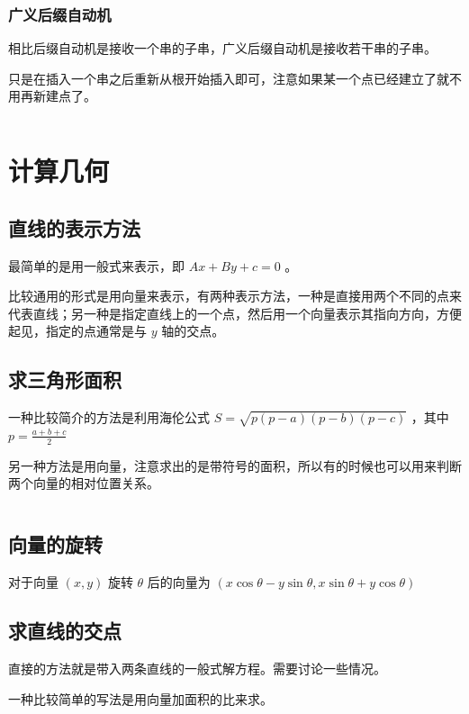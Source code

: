 \documentclass[UTF-8]{ctexart}
\newcommand{\cpp}[1]{\inputminted[bgcolor=bg,breaklines,breakanywhere=true]{c++}{#1}}
\begin{document}
			\subsubsection{广义后缀自动机}
			相比后缀自动机是接收一个串的子串，广义后缀自动机是接收若干串的子串。
	
			只是在插入一个串之后重新从根开始插入即可，注意如果某一个点已经建立了就不用再新建点了。
			\cpp{code//String//lsam.cpp}
	\newpage
	\section{计算几何}
		\subsection{直线的表示方法}
		最简单的是用一般式来表示，即 $Ax+By+c=0$ 。  
	
		比较通用的形式是用向量来表示，有两种表示方法，一种是直接用两个不同的点来代表直线；另一种是指定直线上的一个点，然后用一个向量表示其指向方向，方便起见，指定的点通常是与 $y$ 轴的交点。
		\subsection{求三角形面积}
		一种比较简介的方法是利用海伦公式 $S=\sqrt{p(p-a)(p-b)(p-c)}$ ，其中 $p=\frac{a+b+c}{2}$
	
		另一种方法是用向量，注意求出的是带符号的面积，所以有的时候也可以用来判断两个向量的相对位置关系。
		\cpp{code//Geometry//cross.cpp}
		\subsection{向量的旋转}
		对于向量 $(x,y)$ 旋转 $\theta$ 后的向量为 $(x\cos\theta-y\sin\theta,x\sin\theta+y\cos\theta)$
		
		\subsection{求直线的交点}
		直接的方法就是带入两条直线的一般式解方程。需要讨论一些情况。  
		
		一种比较简单的写法是用向量加面积的比来求。
		  
\end{document}
